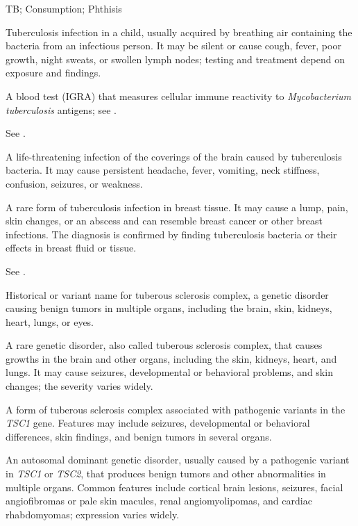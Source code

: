 \synonyms
TB; Consumption; Phthisis

 Tuberculosis infection in a child, usually acquired by breathing air containing the bacteria from an infectious person. It may be silent or cause cough, fever, poor growth, night sweats, or swollen lymph nodes; testing and treatment depend on exposure and findings.

 A blood test (IGRA) that measures cellular immune reactivity to \textit{Mycobacterium tuberculosis} antigens; see .

 See .

 A life-threatening infection of the coverings of the brain caused by tuberculosis bacteria. It may cause persistent headache, fever, vomiting, neck stiffness, confusion, seizures, or weakness.

 A rare form of tuberculosis infection in
  breast tissue. It may cause a lump, pain, skin changes, or an abscess
  and can resemble breast cancer or other breast infections. The
  diagnosis is confirmed by finding tuberculosis bacteria or their
  effects in breast fluid or tissue.

 See .

 Historical or variant name for tuberous sclerosis complex, a genetic disorder causing benign tumors in multiple organs, including the brain, skin, kidneys, heart, lungs, or eyes.

 A rare genetic disorder, also called tuberous sclerosis complex, that causes growths in the brain and
other organs, including the skin, kidneys, heart, and lungs. It may cause seizures, developmental or
behavioral problems, and skin changes; the severity varies widely.

 A form of tuberous sclerosis complex associated with pathogenic variants in the \textit{TSC1} gene. Features may include seizures, developmental or behavioral differences, skin findings, and benign tumors in several organs.

 An autosomal dominant genetic disorder, usually caused by a pathogenic variant in \textit{TSC1} or \textit{TSC2}, that produces benign tumors and other abnormalities in multiple organs. Common features include cortical brain lesions, seizures, facial angiofibromas or pale skin macules, renal angiomyolipomas, and cardiac rhabdomyomas; expression varies widely.

